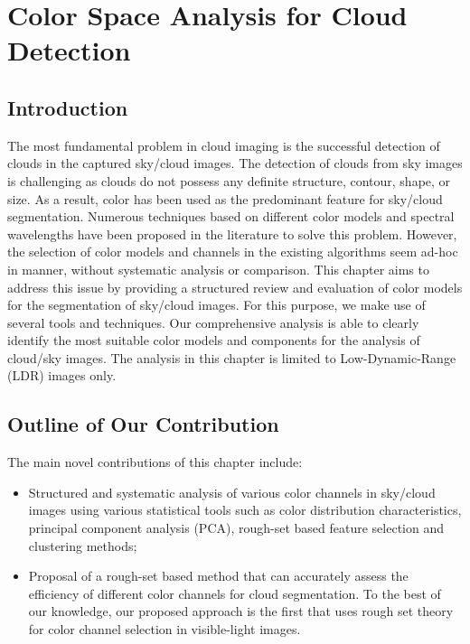 \chapter{Color Space Analysis for Cloud Detection}
\label{chap:colorchannels}


\section{Introduction}

The most fundamental problem in cloud imaging is the successful detection of clouds in the captured sky/cloud images. The detection of clouds from sky images is challenging as clouds do not possess any definite structure, contour, shape, or size. As a result, color has been used as the predominant feature for sky/cloud segmentation. Numerous techniques based on different color models and spectral wavelengths have been proposed in the literature to solve this problem. However, the selection of color models and channels in the existing algorithms seem ad-hoc in manner, without systematic analysis or comparison.  This chapter aims to address this issue by providing a structured review and evaluation of color models for the segmentation of sky/cloud images.  For this purpose, we make use of several tools and techniques. Our comprehensive analysis is able to clearly identify the most suitable color models and components for the analysis of cloud/sky images. The analysis in this chapter is limited to Low-Dynamic-Range (LDR) images only.

\section{Outline of Our Contribution}

The main novel contributions of this chapter include: 

\begin{itemize}
\item Structured and systematic analysis of various color channels in sky/cloud images using various statistical tools such as color distribution characteristics, principal component analysis (PCA), rough-set based feature selection and clustering methods;
\item Proposal of a rough-set based method that can accurately assess the efficiency of different color channels for cloud segmentation. To the best of our knowledge, our proposed approach is the first that uses rough set theory for color channel selection in visible-light images. 
\end{itemize}


